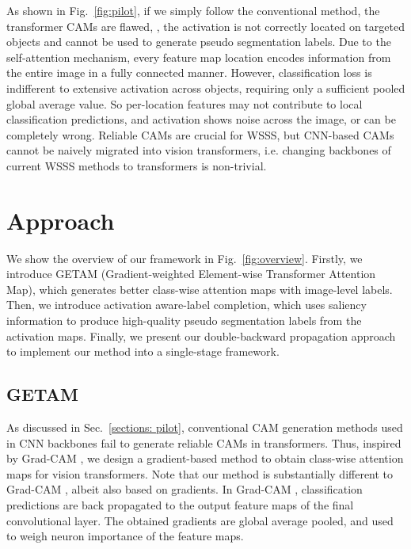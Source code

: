 \documentclass[10pt,twocolumn,letterpaper]{article}
\begin{document}
As shown in Fig.~\ref{fig:pilot}, if we simply follow the conventional method, the transformer CAMs are flawed, \ie, the activation is not correctly located on targeted objects and cannot be used to generate pseudo segmentation labels.
Due to the self-attention mechanism, every feature map location encodes information from the entire image in a fully connected manner. However, classification loss is indifferent to extensive activation across objects, requiring only a sufficient pooled global average value.
So per-location features may not contribute to local classification predictions, and activation shows noise across the image, or can be completely wrong.
Reliable CAMs are crucial for WSSS, but CNN-based CAMs cannot be naively migrated into vision transformers, i.e. changing backbones of current WSSS methods to transformers is non-trivial.


\section{Approach}
We show the overview of our framework in Fig.~\ref{fig:overview}.
Firstly, we introduce GETAM (Gradient-weighted Element-wise Transformer Attention Map), which generates better class-wise attention maps with image-level labels.
Then, we introduce activation aware-label completion, which uses saliency information to produce high-quality pseudo segmentation labels from the activation maps.
Finally, we present our double-backward propagation approach to implement our method into a single-stage framework.

\subsection{GETAM}
As discussed in Sec.~\ref{sections: pilot}, conventional CAM generation methods used in CNN backbones fail to generate reliable CAMs in transformers.
Thus, inspired by Grad-CAM \cite{selvaraju2017grad}, we design a gradient-based method to obtain class-wise attention maps for vision transformers.
Note that our method is substantially different to Grad-CAM \cite{selvaraju2017grad}, albeit also based on gradients.
In Grad-CAM \cite{selvaraju2017grad}, classification predictions are back propagated to the output feature maps of the final convolutional
layer.
The obtained gradients are global average pooled, and
used to weigh neuron 
importance of the feature maps.
\end{document}
